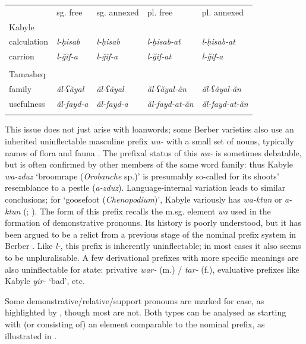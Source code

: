 \documentclass[output=paper]{langscibook}
\begin{document}
\begin{tabularx}{\textwidth}{XXXXX}
 & sg. free & sg. annexed & pl. free & pl. annexed\\
\lsptoprule
Kabyle &  &  &  & \\
calculation & \textit{l-ḥisab} & \textit{l-ḥisab} & \textit{l-ḥisab-at} & \textit{l-ḥisab-at}\\
carrion & \textit{l-ğif-a} & \textit{l-ğif-a} & \textit{l-ğif-at} & \textit{l-ğif-a}\\
&  &  &  & \\
Tamasheq &  &  &  & \\
family & \textit{ăl-ʕăyal} & \textit{ăl-ʕăyal} & \textit{ăl-ʕăyal-ăn} & \textit{ăl-ʕăyal-ăn}\\
usefulness & \textit{ăl-fayd-a} & \textit{ăl-fayd-a} & \textit{ăl-fayd-at-ăn} & \textit{ăl-fayd-at-ăn}\\
\lspbottomrule
\end{tabularx}
\begin{styleStandarduser}
This issue does not just arise with loanwords; some Berber varieties also use an inherited uninflectable masculine prefix \textit{wa-} with a small set of nouns, typically names of flora and fauna \citep{Brugnatelli1998}. The prefixal status of this \textit{wa-} is sometimes debatable, but is often confirmed by other members of the same word family: thus Kabyle \textit{wa-zduz} ‘broomrape (\textit{Orobanche} sp.)’ is presumably so-called for its shoots’ resemblance to a pestle (\textit{a-zduz}). Language-internal variation leads to similar conclusions; for ‘goosefoot (\textit{Chenopodium})’, Kabyle variously has \textit{wa-ktun} or \textit{a-ktun} (\citealt{Zidat2016}; \citealt{Dallet1982}). The form of this prefix recalls the m.sg. element \textit{wa} used in the formation of demonstrative pronouns. Its history is poorly understood, but it has been argued to be a relict from a previous stage of the nominal prefix system in Berber \citep{Brugnatelli1997}. Like \textit{l-}, this prefix is inherently uninflectable; in most cases it also seems to be unpluralisable. A few derivational prefixes with more specific meanings are also uninflectable for state: privative \textit{war-} (m.) / \textit{tar-} (f.), evaluative prefixes like Kabyle \textit{yir-} ‘bad’, etc.
\end{styleStandarduser}

\begin{styleStandarduser}
Some demonstrative/relative/support pronouns are marked for case, as highlighted by \citet{Brugnatelli2006}, though most are not. Both types can be analysed as starting with (or consisting of) an element comparable to the nominal prefix, as illustrated in .
\end{styleStandarduser}
\end{document}
